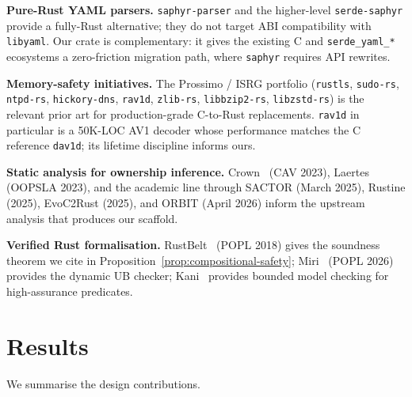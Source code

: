 \documentclass[12pt]{article}
\theoremstyle{definition}
\theoremstyle{remark}
\begin{document}
\textbf{Pure-Rust YAML parsers.} \texttt{saphyr-parser} and the higher-level
\texttt{serde-saphyr} provide a fully-Rust alternative; they do not target
ABI compatibility with \texttt{libyaml}. Our crate is complementary: it
gives the existing C and \texttt{serde\_yaml\_*} ecosystems a
zero-friction migration path, where \texttt{saphyr} requires API rewrites.

\textbf{Memory-safety initiatives.} The Prossimo / ISRG portfolio
(\texttt{rustls}, \texttt{sudo-rs}, \texttt{ntpd-rs},
\texttt{hickory-dns}, \texttt{rav1d}, \texttt{zlib-rs}, \texttt{libbzip2-rs},
\texttt{libzstd-rs}) is the relevant prior art for production-grade
C-to-Rust replacements. \texttt{rav1d} in particular is a 50K-LOC AV1
decoder whose performance matches the C reference \texttt{dav1d};
its lifetime discipline informs ours.

\textbf{Static analysis for ownership inference.} Crown~\cite{crown} (CAV
2023), Laertes~\cite{laertes} (OOPSLA 2023), and the academic line through
SACTOR (March 2025), Rustine (2025), EvoC2Rust (2025), and ORBIT (April
2026) inform the upstream analysis that produces our scaffold.

\textbf{Verified Rust formalisation.} RustBelt~\cite{rustbelt} (POPL 2018)
gives the soundness theorem we cite in Proposition~\ref{prop:compositional-safety};
Miri~\cite{miri-popl2026} (POPL 2026) provides the dynamic UB checker;
Kani~\cite{kani} provides bounded model checking for high-assurance
predicates.

\section{Results}
\label{sec:results}

We summarise the design contributions.
\end{document}
